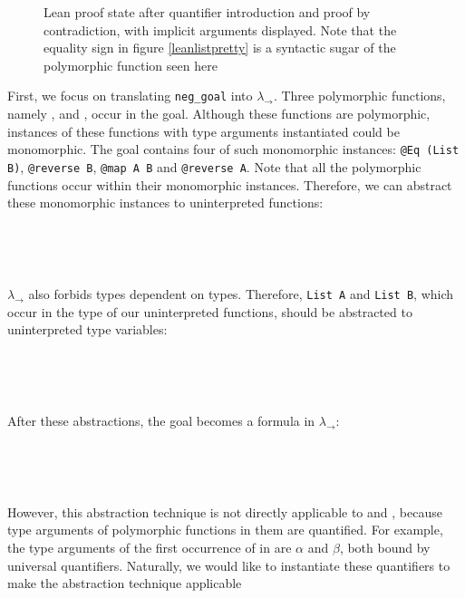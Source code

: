\begin{figure}
  \begin{CenteredBox}
    
  \end{CenteredBox}
  \caption{Lean proof state after quantifier introduction and proof by contradiction, with implicit arguments displayed.
    Note that the equality sign in figure \ref{leanlistpretty} is a syntactic sugar of
    the polymorphic function {\usebox{\vEq}} seen here}
  \label{leanlistexplicit}
\end{figure}

\noindent First, we focus on translating \texttt{neg\_goal} into $\lambda_\to$. Three polymorphic functions,
namely \usebox{\vEq}, \usebox{\vmap} and \usebox{\vrev}, occur in the goal.
Although these functions are polymorphic, instances of these functions
with type arguments instantiated could be monomorphic. The goal contains four of
such monomorphic instances: \texttt{@Eq (List B)}, \texttt{@reverse B}, \texttt{@map A B}
and \texttt{@reverse A}. Note that all the polymorphic functions occur
within their monomorphic instances. Therefore, we can abstract these monomorphic
instances to uninterpreted functions:

\

\begin{CenteredBox}
    
\end{CenteredBox}
\

\noindent $\lambda_\to$ also forbids types dependent on types.
Therefore, \texttt{List A} and \texttt{List B}, which occur in the type of our
uninterpreted functions, should be abstracted to uninterpreted type variables:

\

\begin{CenteredBox}
  
\end{CenteredBox}
\

\noindent After these abstractions, the goal becomes a formula in $\lambda_\to$:

\

\begin{CenteredBox}
    
\end{CenteredBox}
\

\noindent However, this abstraction technique is not directly applicable to \usebox{\vmaprev} and
\usebox{\vrevrev}, because type arguments of polymorphic functions in them are quantified. For
example, the type arguments of the first occurrence of \usebox{\vmap} in \usebox{\vmaprev}
are $\alpha$ and $\beta$, both bound by universal quantifiers. Naturally, we would like
to instantiate these quantifiers to make the abstraction technique applicable

